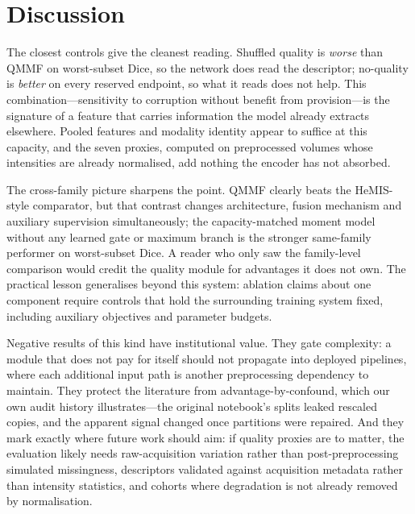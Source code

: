 \section{Discussion}
\label{sec:discussion}

The closest controls give the cleanest reading. Shuffled quality is \emph{worse} than QMMF on worst-subset Dice, so the network does read the descriptor; no-quality is \emph{better} on every reserved endpoint, so what it reads does not help. This combination---sensitivity to corruption without benefit from provision---is the signature of a feature that carries information the model already extracts elsewhere. Pooled features and modality identity appear to suffice at this capacity, and the seven proxies, computed on preprocessed volumes whose intensities are already normalised, add nothing the encoder has not absorbed.

The cross-family picture sharpens the point. QMMF clearly beats the HeMIS-style comparator, but that contrast changes architecture, fusion mechanism and auxiliary supervision simultaneously; the capacity-matched moment model without any learned gate or maximum branch is the stronger same-family performer on worst-subset Dice. A reader who only saw the family-level comparison would credit the quality module for advantages it does not own. The practical lesson generalises beyond this system: ablation claims about one component require controls that hold the surrounding training system fixed, including auxiliary objectives and parameter budgets.

Negative results of this kind have institutional value. They gate complexity: a module that does not pay for itself should not propagate into deployed pipelines, where each additional input path is another preprocessing dependency to maintain. They protect the literature from advantage-by-confound, which our own audit history illustrates---the original notebook's splits leaked rescaled copies, and the apparent signal changed once partitions were repaired. And they mark exactly where future work should aim: if quality proxies are to matter, the evaluation likely needs raw-acquisition variation rather than post-preprocessing simulated missingness, descriptors validated against acquisition metadata rather than intensity statistics, and cohorts where degradation is not already removed by normalisation.

